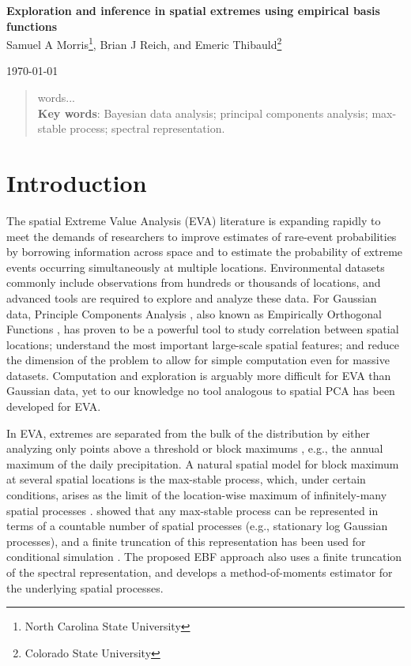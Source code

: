 \documentclass[11pt]{article}
\begin{document}
\linenumbers
\pagestyle{empty}
\begin{center}
{\Large {\bf Exploration and inference in spatial extremes using empirical basis functions}}\\

{\large Samuel A Morris\footnote[1]{North Carolina State University}, Brian J Reich\footnotemark[1]{}, and Emeric Thibauld\footnote[2]{Colorado State University}}

\today
\end{center}


\begin{abstract}
	words...\\
	{\bf Key words}: Bayesian data analysis; principal components analysis; max-stable process; spectral representation.

\end{abstract}
\newpage
\pagestyle{plain}
\setcounter{page}{1}

\section{Introduction}\label{ebs:intro}
The spatial Extreme Value Analysis (EVA) literature is expanding rapidly \citep{Davison2012} to meet the demands of researchers to improve estimates of rare-event probabilities by borrowing information across space and to estimate the probability of extreme events occurring simultaneously at multiple locations.
Environmental datasets commonly include observations from hundreds or thousands of locations, and advanced tools are required to explore and analyze these data.
For Gaussian data, Principle Components Analysis \citep[PCA]{Everitt2008}, also known as Empirically Orthogonal Functions \citep[EOF]{Toggweiler2001}, has proven to be a powerful tool to study correlation between spatial locations; understand the most important large-scale spatial features; and reduce the dimension of the problem to allow for simple computation even for massive datasets.
Computation and exploration is arguably more difficult for EVA than Gaussian data, yet to our knowledge no tool analogous to spatial PCA has been developed for EVA.

In EVA, extremes are separated from the bulk of the distribution by either analyzing only points above a threshold or block maximums \citep{Coles2001}, e.g., the annual maximum of the daily precipitation.
A natural spatial model for block maximum at several spatial locations is the max-stable process, which, under certain conditions, arises as the limit of the location-wise maximum of infinitely-many spatial processes \citep{deHaan2006}.
 showed that any max-stable process can be represented in terms of a countable number of spatial processes (e.g., stationary log Gaussian processes), and a finite truncation of this representation has been used for conditional simulation \citep{Wang2011}.
The proposed EBF approach also uses a finite truncation of the spectral representation, and develops a method-of-moments estimator for the underlying spatial processes.
\end{document}
